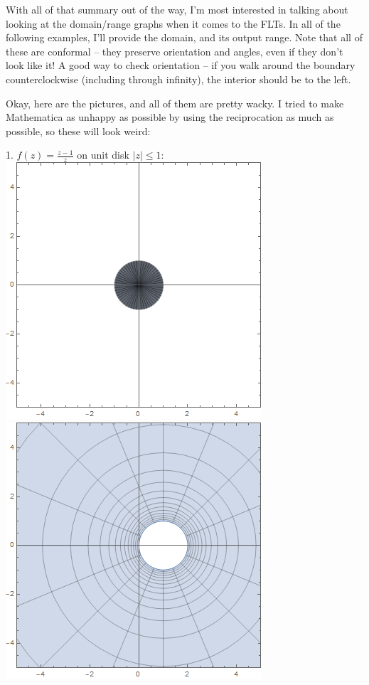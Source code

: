 With all of that summary out of the way, I'm most interested in talking about looking at the domain/range graphs when it comes to the FLTs. In all of the following examples, I'll provide the domain, and its output range. Note that all of these are conformal -- they preserve orientation and angles, even if they don't look like it! A good way to check orientation -- if you walk around the boundary counterclockwise (including through infinity), the interior should be to the left.

Okay, here are the pictures, and all of them are pretty wacky.  I tried to make Mathematica as unhappy as possible by using the reciprocation as much as possible, so these will look weird:
\begin{center}
    1. $f(z) = \frac{z-1}{z}$ on unit disk $|z| \leq 1$: \\
    \includegraphics[scale=0.3]{images/mobius1dom.png}
    \includegraphics[scale=0.3]{images/mobius1ran.png}
\end{center}

